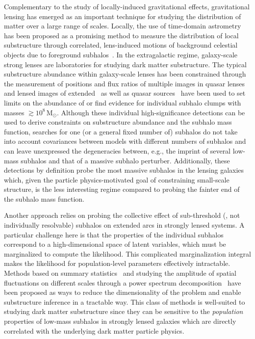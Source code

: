 \documentclass[twocolumn]{aastex63}
\begin{document}
Complementary to the study of locally-induced gravitational effects, gravitational lensing has emerged as an important technique for studying the distribution of matter over a large range of scales. Locally, the use of time-domain astrometry has been proposed as a promising method to measure the distribution of local substructure through correlated, lens-induced motions of background celestial objects due to foreground subhalos~\citep{2018JCAP...07..041V}. In the extragalactic regime, galaxy-scale strong lenses are laboratories for studying dark matter substructure. The typical substructure abundance within galaxy-scale lenses has been constrained through the measurement of positions and flux ratios of multiple images in quasar lenses~\citep{2002ApJ...572...25D,2019arXiv190504182H} and lensed images of extended~\citep{0910.0760,1002.4708,1201.3643,1601.01388} as well as quasar sources~\citep{1109.0548,1402.1496,1701.05188,1908.06983} have been used to set limits on the abundance of or find evidence for individual subhalo clumps with masses $\gtrsim 10^8\,\mathrm{M}_\odot$. Although these individual high-significance detections can be used to derive constraints on substructure abundance and the subhalo mass function, searches for one (or a general fixed number of) subhalos do not take into account covariances between models with different numbers of subhalos and can leave unexpressed the degeneracies between, e.g., the imprint of several low-mass subhalos and that of a massive subhalo perturber. Additionally, these detections by definition probe the most massive subhalos in the lensing galaxies which, given the particle physics-motivated goal of constraining small-scale structure, is the less interesting regime compared to probing the fainter end of the subhalo mass function.

Another approach relies on probing the collective effect of sub-threshold (\ie, not individually resolvable) subhalos on extended arcs in strongly lensed systems. A particular challenge here is that the  properties of the individual subhalos correspond to a high-dimensional space of latent variables, which must be marginalized to compute the likelihood. This complicated marginalization integral makes the likelihood for population-level parameters effectively intractable. Methods based on summary statistics~\citep{1702.00009} and studying the amplitude of spatial fluctuations on different scales through a power spectrum decomposition~\citep{1403.2720,1506.01724,1707.04590,1710.03075,1809.00004,1806.07897,1808.03501} have been proposed as ways to reduce the dimensionality of the problem and enable substructure inference in a tractable way. This class of methods is well-suited to studying dark matter substructure since they can be sensitive to the \emph{population} properties of low-mass subhalos in strongly lensed galaxies which are directly correlated with the underlying dark matter particle physics.
\end{document}
